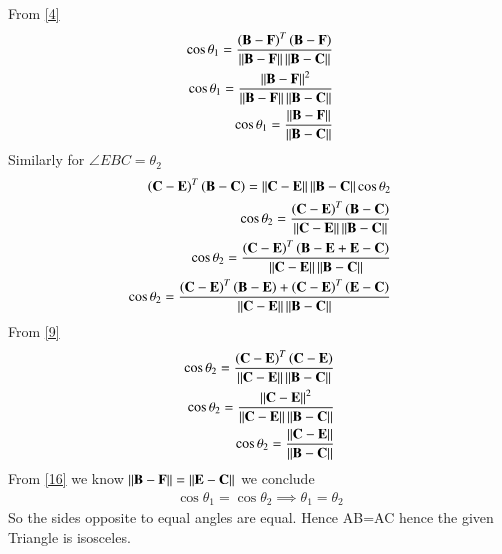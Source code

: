 \documentclass[journal,12pt,twocolumn]{IEEEtran}
\begin{document}
        From \eqref{4}
        \begin{align}
          \cos{\theta_1}=\frac{\left(\mathbf{B}-\mathbf{F}\right)^T\left(\mathbf{B}-\mathbf{F}\right)}{\left\lVert\mathbf{B}-\mathbf{F}\right\rVert\left\lVert\mathbf{B}-\mathbf{C}\right\rVert} \\
          \cos{\theta_1}=\frac{\left\lVert\mathbf{B}-\mathbf{F}\right\rVert^2}{\left\lVert\mathbf{B}-\mathbf{F}\right\rVert\left\lVert\mathbf{B}-\mathbf{C}\right\rVert}\\
          \cos{\theta_1}=\frac{\left\lVert\mathbf{B}-\mathbf{F}\right\rVert}{\left\lVert\mathbf{B}-\mathbf{C}\right\rVert}
        \end{align}
        Similarly for $\angle EBC=\theta_2$
       \begin{align}
        \left(\mathbf{C}-\mathbf{E}\right)^T\left(\mathbf{B}-\mathbf{C}\right)=\left\lVert\mathbf{C}-\mathbf{E}\right\rVert\left\lVert\mathbf{B}-\mathbf{C}\right\rVert\cos\theta_2\\
        \cos{\theta_2}=\frac{\left(\mathbf{C}-\mathbf{E}\right)^T\left(\mathbf{B}-\mathbf{C}\right)}{\left\lVert\mathbf{C}-\mathbf{E}\right\rVert\left\lVert\mathbf{B}-\mathbf{C}\right\rVert}\\
        \cos{\theta_2}=\frac{\left(\mathbf{C}-\mathbf{E}\right)^T\left(\mathbf{B}-\mathbf{E}+\mathbf{E}-\mathbf{C}\right)}{\left\lVert\mathbf{C}-\mathbf{E}\right\rVert\left\lVert\mathbf{B}-\mathbf{C}\right\rVert}\\
        \cos{\theta_2}=\frac{\left(\mathbf{C}-\mathbf{E}\right)^T\left(\mathbf{B}-\mathbf{E}\right) +\left(\mathbf{C}-\mathbf{E}\right)^T\left(\mathbf{E}-\mathbf{C}\right)}{\left\lVert\mathbf{C}-\mathbf{E}\right\rVert\left\lVert\mathbf{B}-\mathbf{C}\right\rVert}
        \end{align}
        From {\eqref{9}}
        \begin{align}
          \cos{\theta_2}=\frac{\left(\mathbf{C}-\mathbf{E}\right)^T\left(\mathbf{C}-\mathbf{E}\right)}{\left\lVert\mathbf{C}-\mathbf{E}\right\rVert\left\lVert\mathbf{B}-\mathbf{C}\right\rVert} \\
          \cos{\theta_2}=\frac{\left\lVert\mathbf{C}-\mathbf{E}\right\rVert^2}{\left\lVert\mathbf{C}-\mathbf{E}\right\rVert\left\lVert\mathbf{B}-\mathbf{C}\right\rVert}\\
          \cos{\theta_2}=\frac{\left\lVert\mathbf{C}-\mathbf{E}\right\rVert}{\left\lVert\mathbf{B}-\mathbf{C}\right\rVert}
        \end{align}
        From \eqref{16} we know $\left\lVert\mathbf{B}-\mathbf{F}\right\rVert=\left\lVert\mathbf{E}-\mathbf{C}\right\rVert$ we conclude
        \begin{align}
            \cos\theta_1=\cos\theta_2
            \implies\theta_1=\theta_2
        \end{align}
        So the sides opposite to equal angles are equal. Hence AB=AC hence the given Triangle is isosceles.
    
\end{document}
